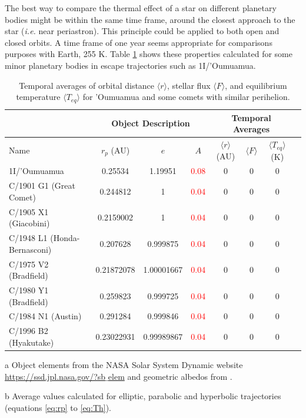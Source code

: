 \documentclass[a4paper,fleqn,usenatbib]{mnras}
\newcommand{\fix}{\textcolor{red}}
\begin{document}
The best way to compare the thermal effect of a star on different planetary bodies might be within the same time frame, around the closest approach to the star (\emph{i.e.} near periastron). This principle could be applied to both open and closed orbits. A time frame of one year seems appropriate for comparisons purposes with Earth, 255 K. Table \ref{tab:escape} shows these properties calculated for some minor planetary bodies in escape trajectories such as 1I/'Oumuamua.

\begin{table}
\begin{threeparttable}
\centering
\caption{Temporal averages of orbital distance $\langle r \rangle$, stellar flux $\langle F \rangle$, and equilibrium temperature $\langle T_{eq} \rangle$ for 'Oumuamua and some comets with similar perihelion.}
\begin{tabular}{ l c c c c | c c c }
 \hline
 \hline
 & \multicolumn{3}{c}{Object Description\tnote{a}} & \multicolumn{3}{c}{Temporal Averages\tnote{b}} \\
 \hline
 Name & $r_p$ (AU) & $e$ & $A$ &
 	$\langle r \rangle$ (AU) & $\langle F \rangle$ & $\langle T_{eq} \rangle$ (K) \\ 
 \hline
 1I/'Oumuamua & 0.25534 & 1.19951 & \fix{0.08} & 0  & 0 & 0 \\
 C/1901 G1 (Great Comet) & 0.244812 & 1 & \fix{0.04} & 0  & 0 & 0 \\
 C/1905 X1 (Giacobini) & 0.2159002 & 1 & \fix{0.04} & 0  & 0 & 0 \\
C/1948 L1 (Honda-Bernasconi) & 0.207628 & 0.999875 & \fix{0.04} & 0  & 0 & 0 \\
 C/1975 V2 (Bradfield) & 0.21872078 & 1.00001667 & \fix{0.04} & 0  & 0 & 0 \\
 C/1980 Y1 (Bradfield) & 0.259823 & 0.999725 & \fix{0.04} & 0  & 0 & 0 \\
 C/1984 N1 (Austin) & 0.291284 & 0.999846 & \fix{0.04} & 0  & 0 & 0 \\
 C/1996 B2 (Hyakutake) & 0.23022931	& 0.99989867 & \fix{0.04} & 0  & 0 & 0 \\
 \hline
 \hline
\end{tabular}
\label{tab:escape}
	\begin{tablenotes}
	\small
\item[a]{Object elements from the NASA Solar System Dynamic website \href{https://ssd.jpl.nasa.gov/?sb$\_$elem}{https://ssd.jpl.nasa.gov/?sb$\_$elem} and geometric albedos from \citep{2004come.book..223L}.}
\item[b]{Average values calculated for elliptic, parabolic and hyperbolic trajectories (equations \ref{eq:rp} to \ref{eq:Th}).}
	\end{tablenotes}
\end{threeparttable}
\end{table}
\end{document}
